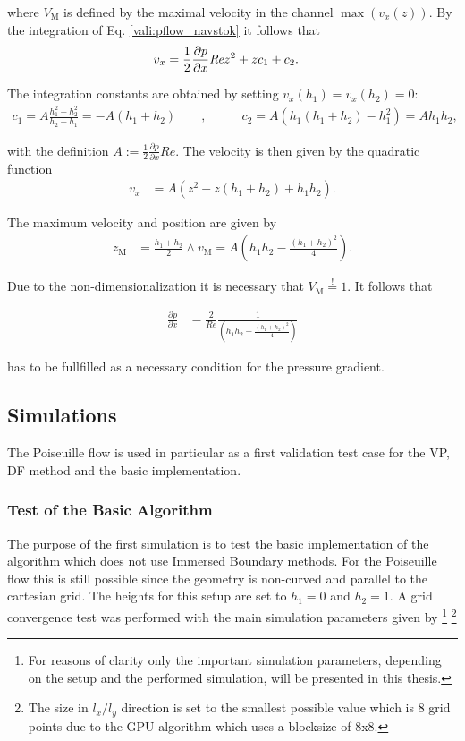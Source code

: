 where $V_\text{M}$ is defined by the maximal velocity in the channel $\max(v_x(z))$.
By the integration of Eq. \ref{vali:pflow_navstok} it follows that
\begin{align}
v_x &= \frac{1}{2}\frac{\partial p}{\partial x}\mbox{\textit{Re}} z^2 + zc_1 + c_2.
\end{align}

The integration constants are obtained by setting $v_x(h_1) = v_x(h_2) = 0$:
\begin{align}
c_1 = A\frac{h_1^2 -h_2^2}{h_2 - h_1} = -A(h_1+h_2)\qquad ,& \qquad
c_2 = A(h_1(h_1 + h_2) - h_1^2) = Ah_1h_2,
\end{align}

with the definition $A:=\frac{1}{2}\frac{\partial p}{\partial x} Re$.
The velocity is then given by the quadratic function
\begin{align}
\label{vali:pflow_theosol}
v_x &= A(z^2 - z(h_1 + h_2) + h_1h_2).
\end{align}

The maximum velocity and position are given by
\begin{align}
z_{\text{M}} &= \frac{h_1+h_2}{2} \wedge v_{\text{M}} = A\left(h_1h_2 - \frac{(h_1 + h_2)^2}{4}\right).
\end{align}

Due to the non-dimensionalization it is necessary that $V_{\text{M}} \overset{!}{=}  1$.
It follows that

\begin{align}
    \label{vali:pflow_pcondi}
\frac{\partial p}{\partial x} &= \frac{2}{Re}\frac{1}{\left(h_1h_2 - \frac{(h_1+h_2)^2}{4} \right)}
\end{align}

has to be fullfilled as a necessary condition for the pressure gradient.

\subsection{Simulations}

The Poiseuille flow is used in particular as a first validation test case
for the VP, DF method  and the basic implementation.

\subsubsection{Test of the Basic Algorithm}

The purpose of the first simulation is to test  the basic
implementation of the algorithm which does not use Immersed Boundary methods.
For the Poiseuille flow this is still possible since the geometry is non-curved
and parallel to the cartesian grid. The heights for this setup are set to $h_1=0$ and $h_2=1$.
A grid convergence test was performed with the main simulation parameters given by
\footnote{For reasons of clarity only the important simulation parameters, depending on the setup and the performed simulation,  will be presented in this thesis.}
\footnote{The size in $l_x/l_y$ direction is set to the smallest possible value which is 8 grid points due to the GPU algorithm which uses a blocksize of 8x8.}

